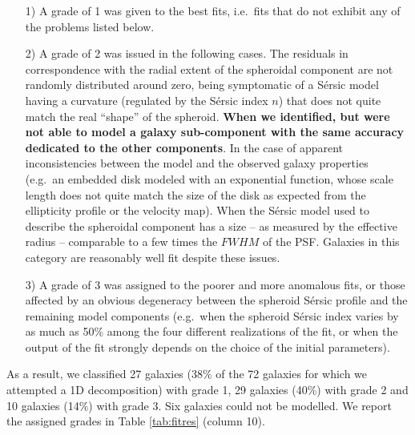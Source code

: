 \documentclass[preprint2]{emulateapj}
\begin{document}
\begin{itemize}
\item [1)] A grade of 1 was given to the best fits, i.e.~fits that do not exhibit any of the problems listed below.
\item [2)] A grade of 2 was issued in the following cases. 
The residuals in correspondence with the radial extent of the spheroidal component are not randomly distributed around zero, 
being symptomatic of a S\'ersic model having a curvature (regulated by the S\'ersic index $n$) 
that does not quite match the real ``shape'' of the spheroid. 
{\bf When we identified, 
but were not able to model a galaxy sub-component with the same accuracy dedicated to the other components}.
In the case of apparent inconsistencies between the model and the observed galaxy properties 
(e.g.~an embedded disk modeled with an exponential function, 
whose scale length does not quite match the size of the disk as expected from the ellipticity profile or the velocity map).
When the S\'ersic model used to describe the spheroidal component has a size -- as measured by the effective radius -- 
comparable to a few times the $FWHM$ of the PSF.
Galaxies in this category are reasonably well fit despite these issues.
\item [3)] A grade of 3 was assigned to the poorer and more anomalous fits, 
or those affected by an obvious degeneracy between the spheroid S\'ersic profile and the remaining model components 
(e.g.~when the spheroid S\'ersic index varies by as much as 50\% among the four different realizations of the fit, 
or when the output of the fit strongly depends on the choice of the initial parameters).
\end{itemize}
As a result, we classified 27 galaxies (38\% of the 72 galaxies for which we attempted a 1D decomposition) with grade 1, 
29 galaxies (40\%) with grade 2 and 10 galaxies (14\%) with grade 3.
Six galaxies could not be modelled.
We report the assigned grades in Table \ref{tab:fitres} (column 10).
\end{document}
